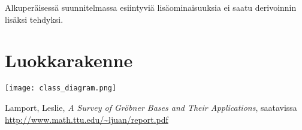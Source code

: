 \documentclass[10pt,a4paper]{article}
\begin{document}
Alkuperäisessä suunnitelmassa esiintyviä lisäominaisuuksia ei saatu derivoinnin lisäksi tehdyksi.

\appendix
\section{Luokkarakenne}
\label{app:luokkarakenne}
\texttt{[image: class\_diagram.png]}

\begin{thebibliography}{9}
	Lamport, Leslie,
	\emph{A Survey of Gröbner Bases and Their Applications},
	saatavissa \url{http://www.math.ttu.edu/~ljuan/report.pdf}
\end{thebibliography}
\end{document}
